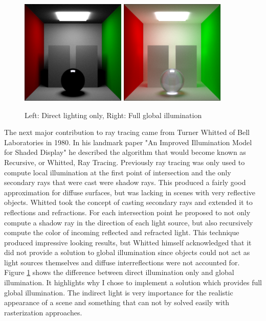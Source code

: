 \documentclass{ACGSeminar}
\begin{document}
\begin{figure}[htb!]
  \centering
  \includegraphics[width=5cm,natwidth=512,natheight=512]{figures/bounces_one.png}
  \includegraphics[width=5cm,natwidth=512,natheight=512]{figures/bounces_many.png}
  \caption{Left: Direct lighting only, Right: Full global illumination}
  \label{fig:rendering-bounces}
\end{figure}

The next major contribution to ray tracing came from Turner Whitted of Bell Laboratories in 1980. In his landmark paper "An Improved Illumination Model for Shaded Display" \cite{Whitted:1980} he described the algorithm that would become known as Recursive, or Whitted, Ray Tracing. Previously ray tracing was only used to compute local illumination at the first point of intersection and the only secondary rays that were cast were shadow rays. This produced a fairly good approximation for diffuse surfaces, but was lacking in scenes with very reflective objects. Whitted took the concept of casting secondary rays and extended it to reflections and refractions. For each intersection point he proposed to not only compute a shadow ray in the direction of each light source, but also recursively compute the color of incoming reflected and refracted light. This technique produced impressive looking results, but Whitted himself acknowledged that it did not provide a solution to global illumination since objects could not act as light sources themselves and diffuse interreflections were not accounted for. Figure \ref{fig:rendering-bounces} shows the difference between direct illumination only and global illumination. It highlights why I chose to implement a solution which provides full global illumination. The indirect light is very importance for the realistic appearance of a scene and something that can not by solved easily with rasterization approaches.
\end{document}

